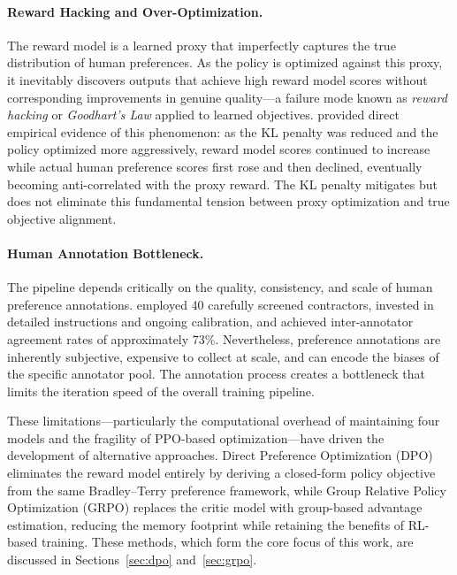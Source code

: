 \paragraph{Reward Hacking and Over-Optimization.}
The reward model is a learned proxy that imperfectly captures the true distribution of human preferences. As the policy is optimized against this proxy, it inevitably discovers outputs that achieve high reward model scores without corresponding improvements in genuine quality---a failure mode known as \emph{reward hacking} or \emph{Goodhart's Law} applied to learned objectives. \cite{stiennon2020learning} provided direct empirical evidence of this phenomenon: as the KL penalty was reduced and the policy optimized more aggressively, reward model scores continued to increase while actual human preference scores first rose and then declined, eventually becoming anti-correlated with the proxy reward. The KL penalty mitigates but does not eliminate this fundamental tension between proxy optimization and true objective alignment.

\paragraph{Human Annotation Bottleneck.}
The pipeline depends critically on the quality, consistency, and scale of human preference annotations. \cite{ouyang2022instructgpt} employed 40 carefully screened contractors, invested in detailed instructions and ongoing calibration, and achieved inter-annotator agreement rates of approximately 73\%. Nevertheless, preference annotations are inherently subjective, expensive to collect at scale, and can encode the biases of the specific annotator pool. The annotation process creates a bottleneck that limits the iteration speed of the overall training pipeline.

\vspace{0.5em}
\noindent These limitations---particularly the computational overhead of maintaining four models and the fragility of PPO-based optimization---have driven the development of alternative approaches. Direct Preference Optimization (DPO) eliminates the reward model entirely by deriving a closed-form policy objective from the same Bradley--Terry preference framework, while Group Relative Policy Optimization (GRPO) replaces the critic model with group-based advantage estimation, reducing the memory footprint while retaining the benefits of RL-based training. These methods, which form the core focus of this work, are discussed in Sections~\ref{sec:dpo} and~\ref{sec:grpo}.
